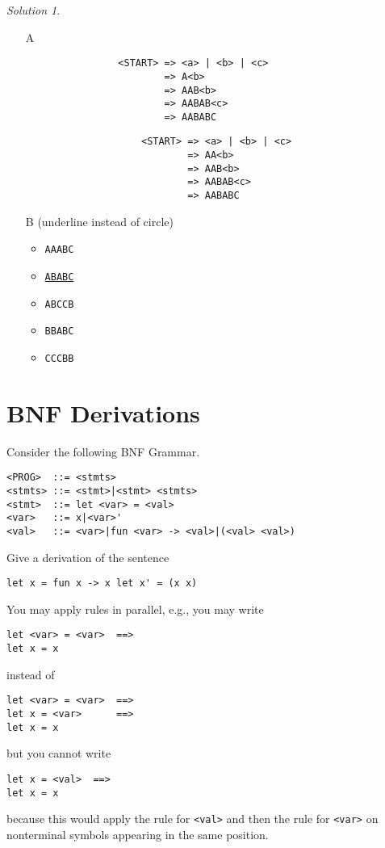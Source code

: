 \documentclass{article}
\theoremstyle{remark} \newtheorem*{solution}{Solution}
\begin{document}
\begin{solution}
\indent
    \begin{itemize}
        \item[A] \indent
            \begin{lstlisting}
                <START> => <a> | <b> | <c>
                        => A<b>
                        => AAB<b>
                        => AABAB<c>
                        => AABABC
            \end{lstlisting}

                \begin{lstlisting}
                    <START> => <a> | <b> | <c>
                            => AA<b>
                            => AAB<b>
                            => AABAB<c>
                            => AABABC
                \end{lstlisting}
        \item[B] 
        (underline instead of circle)
            \begin{itemize}
              \item \texttt{AAABC}
              \item \underline{\texttt{ABABC}}
              \item \texttt{ABCCB}
              \item \texttt{BBABC}
              \item \texttt{CCCBB}

           \end{itemize}
            
    \end{itemize}
\end{solution}

\pagebreak
\section{BNF Derivations}

Consider the following BNF Grammar.
\begin{lstlisting}
<PROG>  ::= <stmts>
<stmts> ::= <stmt>|<stmt> <stmts>
<stmt>  ::= let <var> = <val>
<var>   ::= x|<var>'
<val>   ::= <var>|fun <var> -> <val>|(<val> <val>)
\end{lstlisting}
Give a derivation of the sentence
\begin{lstlisting}
let x = fun x -> x let x' = (x x)
\end{lstlisting}
You may apply rules in parallel, e.g., you may write
\begin{lstlisting}
let <var> = <var>  ==>
let x = x
\end{lstlisting}
instead of
\begin{lstlisting}
let <var> = <var>  ==>
let x = <var>      ==>
let x = x
\end{lstlisting}
but you cannot write
\begin{lstlisting}
let x = <val>  ==>
let x = x
\end{lstlisting}
because this would apply the rule for \texttt{<val>} and then the rule
for \texttt{<var>} on nonterminal symbols appearing in the same
position.
\end{document}
